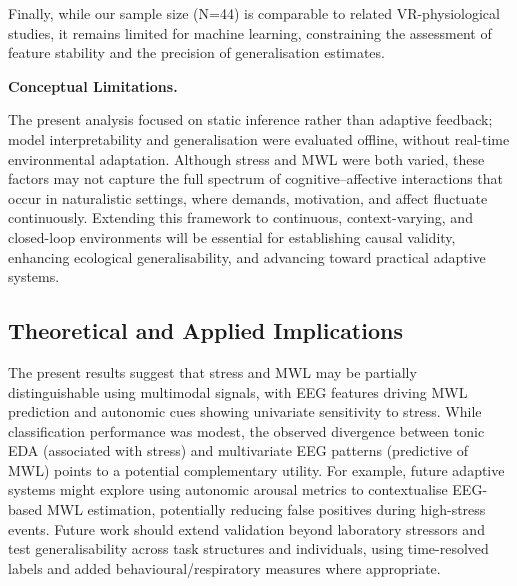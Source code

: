 \documentclass[lettersize,journal]{IEEEtran}
\begin{document}
Finally, while our sample size (N=44) is comparable to related VR-physiological studies, it remains limited for machine learning, constraining the assessment of feature stability and the precision of generalisation estimates.


\textbf{Conceptual Limitations.} 

The present analysis focused on static inference rather than adaptive feedback; model interpretability and generalisation were evaluated offline, without real-time environmental adaptation. 
Although stress and MWL were both varied, these factors may not capture the full spectrum of cognitive–affective interactions that occur in naturalistic settings, where demands, motivation, and affect fluctuate continuously. 
Extending this framework to continuous, context-varying, and closed-loop environments will be essential for establishing causal validity, enhancing ecological generalisability, and advancing toward practical adaptive systems.


\subsection{Theoretical and Applied Implications}

The present results suggest that stress and MWL may be partially distinguishable using multimodal signals, with EEG features driving MWL prediction and autonomic cues showing univariate sensitivity to stress. While classification performance was modest, the observed divergence between tonic EDA (associated with stress) and multivariate EEG patterns (predictive of MWL) points to a potential complementary utility. For example, future adaptive systems might explore using autonomic arousal metrics to contextualise EEG-based MWL estimation, potentially reducing false positives during high-stress events. Future work should extend validation beyond laboratory stressors and test generalisability across task structures and individuals, using time-resolved labels and added behavioural/respiratory measures where appropriate.
\end{document}
